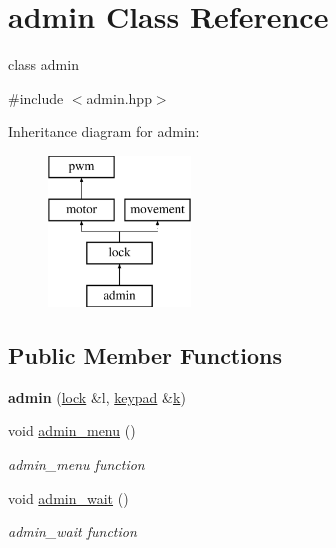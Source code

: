 \hypertarget{classadmin}{}\section{admin Class Reference}
\label{classadmin}


class admin  




{\ttfamily \#include $<$admin.\+hpp$>$}

Inheritance diagram for admin\+:\begin{figure}[H]
\begin{center}
\leavevmode
\includegraphics[height=4.000000cm]{classadmin}
\end{center}
\end{figure}
\subsection*{Public Member Functions}
\begin{DoxyCompactItemize}
\item 
{\bfseries admin} (\hyperlink{classlock}{lock} \&l, \hyperlink{classkeypad}{keypad} \&\hyperlink{classadmin_a945025347c265cad582b368ceca788c3}{k})\hypertarget{classadmin_a16cc376ed398bdf439973cacec5923ff}{}\label{classadmin_a16cc376ed398bdf439973cacec5923ff}

\item 
void \hyperlink{classadmin_a23a0137ba1609edd2f6b6f18eeaac975}{admin\+\_\+menu} ()
\begin{DoxyCompactList}\small\item\em admin\+\_\+menu function \end{DoxyCompactList}\item 
void \hyperlink{classadmin_a08aa886747be71f7916e8cc6c0806c2f}{admin\+\_\+wait} ()
\begin{DoxyCompactList}\small\item\em admin\+\_\+wait function \end{DoxyCompactList}\end{DoxyCompactItemize}

